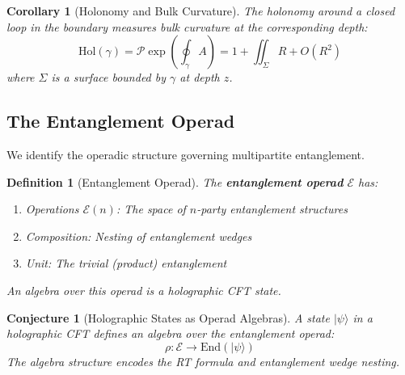 \documentclass[12pt,a4paper]{article}
\newtheorem{conjecture}[theorem]{Conjecture}
\newtheorem{definition}[theorem]{Definition}
\newtheorem{corollary}[theorem]{Corollary}
\begin{document}
\begin{corollary}[Holonomy and Bulk Curvature]
The holonomy around a closed loop in the boundary measures bulk curvature at the corresponding depth:
\begin{equation}
\text{Hol}(\gamma) = \mathcal{P}\exp\left( \oint_\gamma A \right) = 1 + \iint_\Sigma R + O(R^2)
\end{equation}
where $\Sigma$ is a surface bounded by $\gamma$ at depth $z$.
\end{corollary}

\subsection{The Entanglement Operad}

We identify the operadic structure governing multipartite entanglement.

\begin{definition}[Entanglement Operad]
The \textbf{entanglement operad} $\mathcal{E}$ has:
\begin{enumerate}
    \item Operations $\mathcal{E}(n)$: The space of $n$-party entanglement structures
    \item Composition: Nesting of entanglement wedges
    \item Unit: The trivial (product) entanglement
\end{enumerate}
An algebra over this operad is a holographic CFT state.
\end{definition}

\begin{conjecture}[Holographic States as Operad Algebras]
A state $|\psi\rangle$ in a holographic CFT defines an algebra over the entanglement operad:
\begin{equation}
\rho: \mathcal{E} \to \text{End}(|\psi\rangle)
\end{equation}
The algebra structure encodes the RT formula and entanglement wedge nesting.
\end{conjecture}
\end{document}
